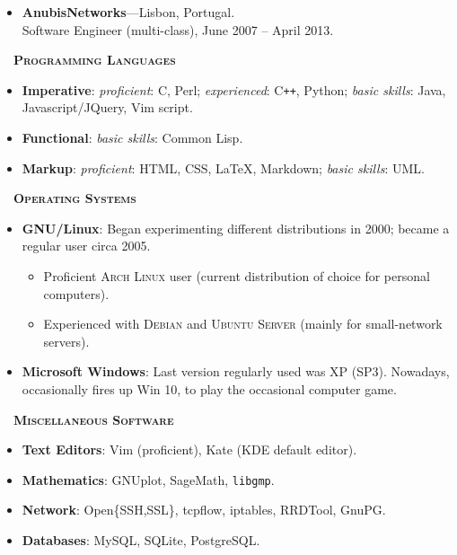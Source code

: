 \documentclass[a4paper,10pt]{extarticle}
\newenvironment{topic}[1]
   {{\noindent\large\bfseries\raisebox{0pt}[\height][1ex]{#1}\hrule\par}%
    \begin{list}{}{%
       \setlength{\leftmargin}{.0cm}}\item[]}
   {\end{list}\medskip}
\begin{document}
\begin{topic}{Professional Experience}
  \begin{itemize}[leftmargin=*]
    \item {\bfseries AnubisNetworks}---Lisbon, Portugal.\\
      Software Engineer (multi-class), June 2007 -- April 2013.
  \end{itemize}
\end{topic}

\begin{topic}{Technical Skills}
  {\rhd\ \ \bfseries \scshape Programming Languages}  
  \begin{itemize}[leftmargin=*]
    \item{\bfseries Imperative}: \emph{proficient}: C, Perl; \emph{experienced}: C{}\verb!++!, Python;
      \emph{basic skills}: Java, Javascript/JQuery, Vim script.
    \item{\bfseries Functional}: \emph{basic skills}: Common Lisp.
    \item{\bfseries Markup}: \emph{proficient}: HTML, CSS, \LaTeX, Markdown; \emph{basic skills}: UML.
  \end{itemize}
  {\rhd\ \ \bfseries \scshape Operating Systems} 
  \begin{itemize}[leftmargin=*]
		\item{\bfseries GNU/Linux}: Began experimenting different distributions in 
			2000; became a regular user circa 2005.
      \begin{itemize}
				\item Proficient \textsc{Arch Linux} user (current distribution of choice for personal computers).
				\item Experienced with \textsc{Debian} and \textsc{Ubuntu Server} (mainly for small-network servers).
      \end{itemize}
		\item{\bfseries Microsoft Windows}: Last version regularly used was XP 
			(SP3). Nowadays, occasionally fires up Win 10, to play the occasional 
			computer game.
  \end{itemize}
  {\rhd\ \ \bfseries \scshape Miscellaneous Software}
	\begin{multicols}{2}
		\begin{itemize}[leftmargin=*]
			\item{\bfseries Text Editors}: Vim (proficient), Kate (KDE default editor).
			\item{\bfseries Mathematics}: GNUplot, SageMath, \texttt{libgmp}.
			\item{\bfseries Network}: Open\{SSH,SSL\}, tcpflow, iptables, RRDTool, GnuPG.
			\item{\bfseries Databases}: MySQL, SQLite, PostgreSQL.
		\end{itemize}
	\end{multicols}
\end{topic}
\end{document}
